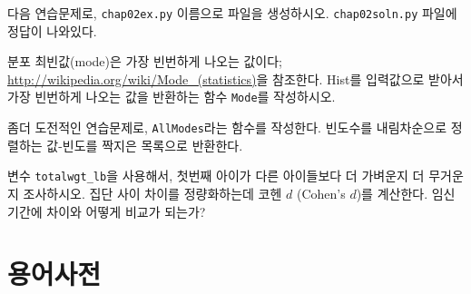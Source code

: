다음 연습문제로, {\tt chap02ex.py} 이름으로 파일을 생성하시오.
\verb"chap02soln.py" 파일에 정답이 나와있다.

\begin{exercise}
분포 최빈값(mode)은 가장 빈번하게 나오는 값이다; 
\url{http://wikipedia.org/wiki/Mode_(statistics)}을 참조한다.  
Hist를 입력값으로 받아서 가장 빈번하게 나오는 값을 반환하는 함수 
{\tt Mode}를 작성하시오.


좀더 도전적인 연습문제로, {\tt AllModes}라는 함수를 작성한다.
빈도수를 내림차순으로 정렬하는 값-빈도를 짝지은 목록으로 반환한다.
\end{exercise}

\begin{exercise}
변수 \verb"totalwgt_lb"을 사용해서, 첫번째 아이가 다른 아이들보다 더 가벼운지
더 무거운지 조사하시오. 집단 사이 차이를 정량화하는데 코헨 $d$ (Cohen's $d$)를 계산한다.
임신 기간에 차이와 어떻게 비교가 되는가?
\end{exercise}


\section{용어사전}

